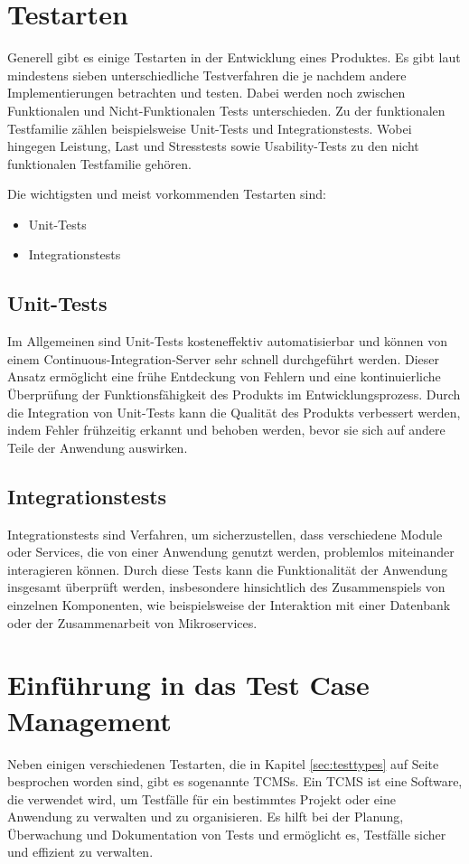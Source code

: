 \documentclass[a4paper, fontsize=11pt, parskip=half, twoside]{scrreprt}
\begin{document}
	
	\section{Testarten} \label{sec:testtypes}
	Generell gibt es einige Testarten in der Entwicklung eines Produktes. 
	Es gibt laut \textcite{atlassian_unterschiedlichen_nodate} mindestens sieben unterschiedliche Testverfahren die je nachdem andere Implementierungen betrachten und testen.
	Dabei werden noch zwischen Funktionalen und Nicht-Funktionalen Tests unterschieden.
	Zu der funktionalen Testfamilie zählen beispielsweise Unit-Tests und Integrationstests.
	Wobei hingegen Leistung, Last und Stresstests sowie Usability-Tests zu den nicht funktionalen Testfamilie gehören.
	\textcite{noauthor_software_nodate}
	
	Die wichtigsten und meist vorkommenden Testarten sind:
	
	\begin{itemize}
		\item Unit-Tests
		\item Integrationstests
	\end{itemize}
	
	\subsection{Unit-Tests}
	Im Allgemeinen sind Unit-Tests kosteneffektiv automatisierbar und können von einem Continuous-Integration-Server sehr schnell durchgeführt werden. 
	Dieser Ansatz ermöglicht eine frühe Entdeckung von Fehlern und eine kontinuierliche Überprüfung der Funktionsfähigkeit des Produkts im Entwicklungsprozess. 
	Durch die Integration von Unit-Tests kann die Qualität des Produkts verbessert werden, indem Fehler frühzeitig erkannt und behoben werden, bevor sie sich auf andere Teile der Anwendung auswirken.
	
	\subsection{Integrationstests}
	Integrationstests sind Verfahren, um sicherzustellen, dass verschiedene Module oder Services, die von einer Anwendung genutzt werden, problemlos miteinander interagieren können. 
	Durch diese Tests kann die Funktionalität der Anwendung insgesamt überprüft werden, insbesondere hinsichtlich des Zusammenspiels von einzelnen Komponenten, wie beispielsweise der Interaktion mit einer Datenbank oder der Zusammenarbeit von Mikroservices.
	
	
	\section{Einführung in das Test Case Management}
	Neben einigen verschiedenen Testarten, die in Kapitel \autoref{sec:testtypes} auf Seite \pageref{sec:testtypes} besprochen worden sind, gibt es sogenannte \aclp{TCMS}.
	Ein \acl{TCMS} ist eine Software, die verwendet wird, um Testfälle für ein bestimmtes Projekt oder eine Anwendung zu verwalten und zu organisieren.
	Es hilft bei der Planung, Überwachung und Dokumentation von Tests und ermöglicht es, Testfälle sicher und effizient zu verwalten.
	
\end{document}
